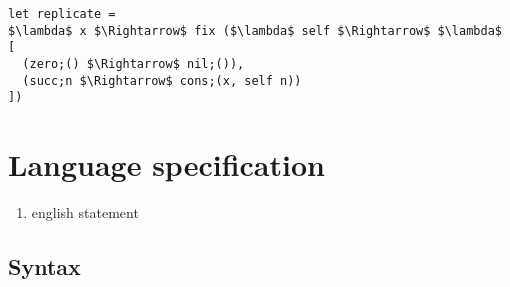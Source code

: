 \documentclass[sigplan,screen]{acmart}
\begin{document}
\begin{lstlisting}[]
let replicate = 
$\lambda$ x $\Rightarrow$ fix ($\lambda$ self $\Rightarrow$ $\lambda$ [
  (zero;() $\Rightarrow$ nil;()),
  (succ;n $\Rightarrow$ cons;(x, self n))
]) 
\end{lstlisting}


\section{Language specification}
\begin{enumerate}
  \item english statement 
\end{enumerate}
\subsection{Syntax}
\end{document}
